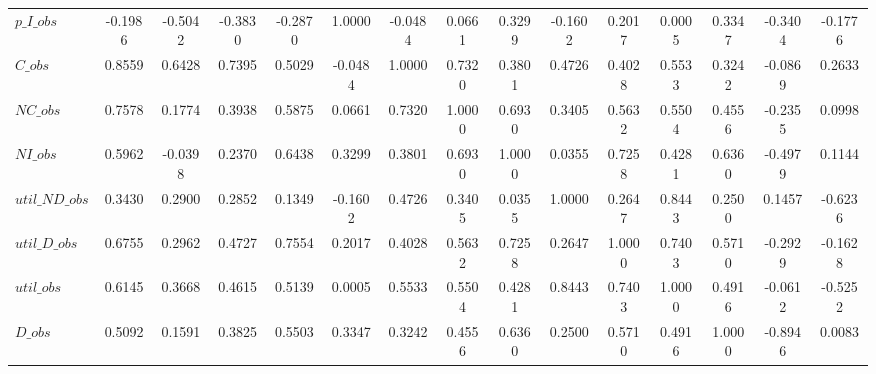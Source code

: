 \begin{center}
\begin{longtable}{lcccccccccccccc}
$p\_I\_obs      $	 & 	          -0.1986	 & 	          -0.5042	 & 	          -0.3830	 & 	          -0.2870	 & 	           1.0000	 & 	          -0.0484	 & 	           0.0661	 & 	           0.3299	 & 	          -0.1602	 & 	           0.2017	 & 	           0.0005	 & 	           0.3347	 & 	          -0.3404	 & 	          -0.1776 \\ 
$C\_obs         $	 & 	           0.8559	 & 	           0.6428	 & 	           0.7395	 & 	           0.5029	 & 	          -0.0484	 & 	           1.0000	 & 	           0.7320	 & 	           0.3801	 & 	           0.4726	 & 	           0.4028	 & 	           0.5533	 & 	           0.3242	 & 	          -0.0869	 & 	           0.2633 \\ 
$NC\_obs        $	 & 	           0.7578	 & 	           0.1774	 & 	           0.3938	 & 	           0.5875	 & 	           0.0661	 & 	           0.7320	 & 	           1.0000	 & 	           0.6930	 & 	           0.3405	 & 	           0.5632	 & 	           0.5504	 & 	           0.4556	 & 	          -0.2355	 & 	           0.0998 \\ 
$NI\_obs        $	 & 	           0.5962	 & 	          -0.0398	 & 	           0.2370	 & 	           0.6438	 & 	           0.3299	 & 	           0.3801	 & 	           0.6930	 & 	           1.0000	 & 	           0.0355	 & 	           0.7258	 & 	           0.4281	 & 	           0.6360	 & 	          -0.4979	 & 	           0.1144 \\ 
$util\_ND\_obs  $	 & 	           0.3430	 & 	           0.2900	 & 	           0.2852	 & 	           0.1349	 & 	          -0.1602	 & 	           0.4726	 & 	           0.3405	 & 	           0.0355	 & 	           1.0000	 & 	           0.2647	 & 	           0.8443	 & 	           0.2500	 & 	           0.1457	 & 	          -0.6236 \\ 
$util\_D\_obs   $	 & 	           0.6755	 & 	           0.2962	 & 	           0.4727	 & 	           0.7554	 & 	           0.2017	 & 	           0.4028	 & 	           0.5632	 & 	           0.7258	 & 	           0.2647	 & 	           1.0000	 & 	           0.7403	 & 	           0.5710	 & 	          -0.2929	 & 	          -0.1628 \\ 
$util\_obs      $	 & 	           0.6145	 & 	           0.3668	 & 	           0.4615	 & 	           0.5139	 & 	           0.0005	 & 	           0.5533	 & 	           0.5504	 & 	           0.4281	 & 	           0.8443	 & 	           0.7403	 & 	           1.0000	 & 	           0.4916	 & 	          -0.0612	 & 	          -0.5252 \\ 
$D\_obs         $	 & 	           0.5092	 & 	           0.1591	 & 	           0.3825	 & 	           0.5503	 & 	           0.3347	 & 	           0.3242	 & 	           0.4556	 & 	           0.6360	 & 	           0.2500	 & 	           0.5710	 & 	           0.4916	 & 	           1.0000	 & 	          -0.8946	 & 	           0.0083 \\ 

\end{longtable}
\end{center}
